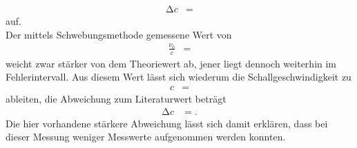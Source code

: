 \begin{align*}
  \increment{c} &= 
\end{align*}
auf.\\
Der mittels Schwebungsmethode gemessene Wert von
\begin{align*}
  \frac{\nu_0}{c} &= 
\end{align*}
weicht zwar stärker von dem Theoriewert ab, jener liegt dennoch weiterhin im Fehlerintervall.
Aus diesem Wert lässt sich wiederum die Schallgeschwindigkeit zu
\begin{align*}
  c &= 
\end{align*}
ableiten, die Abweichung zum Literaturwert beträgt
\begin{align*}
  \increment{c} &= .
\end{align*}
Die hier vorhandene stärkere Abweichung lässt sich damit erklären, dass bei dieser Messung weniger Messwerte aufgenommen werden konnten.
